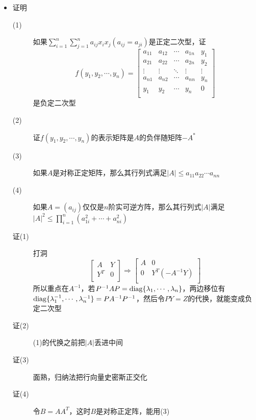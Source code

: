 \begin{itemize}
\item 证明
\begin{description}
\item[(1)] 如果$\sum_{i=1}^n\sum_{j=1}^n a_{ij}x_ix_j(a_{ij}=a_{ji})$是正定二次型，证
\[
f(y_1,y_2,\cdots,y_n)=\left[
\begin{array}{ccccc}
a_{11} & a_{12} & \cdots & a_{1n} & y_1\\
a_{21} & a_{22} & \cdots & a_{2n} & y_2\\
\vdots & \vdots & \ddots & \vdots & \vdots\\
a_{n1} & a_{n2} & \cdots & a_{nn} & y_n\\
y_1 & y_2 & \cdots & y_n & 0\\
\end{array}
\right]
\]
是负定二次型
\item[(2)] 证$f(y_1,y_2,\cdots,y_n)$的表示矩阵是$A$的负伴随矩阵$-A^*$
\item[(3)] 如果$A$是对称正定矩阵，那么其行列式满足$|A|\leq a_{11}a_{22}\cdots a_{nn}$
\item[(4)] 如果$A=(a_{ij})$仅仅是$n$阶实可逆方阵，那么其行列式$|A|$满足$|A|^2\leq \prod_{i=1}^n(a_{1i}^2+\cdots+a_{ni}^2)$
\item[证(1)] 打洞
\[
\left[
\begin{array}{cc}
A & Y\\
Y^T & 0\\
\end{array}
\right] \Rightarrow \left[
\begin{array}{cc}
A & 0\\
0 & Y^T(-A^{-1}Y)\\
\end{array}
\right]
\]
所以重点在$A^{-1}$，若$P^{-1}AP=\operatorname{diag}\{\lambda_1,\cdots,\lambda_n\}$，两边移位有$\operatorname{diag}\{\lambda_1^{-1},\cdots,\lambda_n^{-1}\}=PA^{-1}P^{-1}$，然后令$PY=Z$的代换，就能变成负定二次型
\item[证(2)] (1)的代换之前把$|A|$丢进中间
\item[证(3)] 面熟，归纳法把行向量史密斯正交化
\item[证(4)] 令$B=AA^T$，这时$B$是对称正定阵，能用(3)
\end{description}




























\end{itemize}